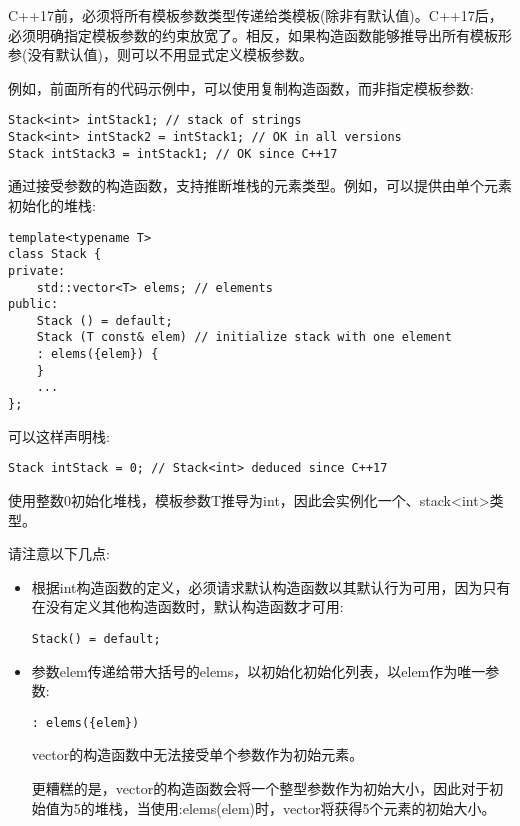 C++17前，必须将所有模板参数类型传递给类模板(除非有默认值)。C++17后，必须明确指定模板参数的约束放宽了。相反，如果构造函数能够推导出所有模板形参(没有默认值)，则可以不用显式定义模板参数。

例如，前面所有的代码示例中，可以使用复制构造函数，而非指定模板参数:

\begin{lstlisting}[style=styleCXX]
Stack<int> intStack1; // stack of strings
Stack<int> intStack2 = intStack1; // OK in all versions
Stack intStack3 = intStack1; // OK since C++17
\end{lstlisting}

通过接受参数的构造函数，支持推断堆栈的元素类型。例如，可以提供由单个元素初始化的堆栈:

\begin{lstlisting}[style=styleCXX]
template<typename T>
class Stack {
private:
	std::vector<T> elems; // elements
public:
	Stack () = default;
	Stack (T const& elem) // initialize stack with one element
	: elems({elem}) {
	}
	...
};
\end{lstlisting}

可以这样声明栈:

\begin{lstlisting}[style=styleCXX]
Stack intStack = 0; // Stack<int> deduced since C++17
\end{lstlisting}

使用整数0初始化堆栈，模板参数T推导为int，因此会实例化一个、stack<int>类型。

请注意以下几点:

\begin{itemize}
\item 
根据int构造函数的定义，必须请求默认构造函数以其默认行为可用，因为只有在没有定义其他构造函数时，默认构造函数才可用:
\begin{lstlisting}[style=styleCXX]
Stack() = default;
\end{lstlisting}

\item 
参数elem传递给带大括号的elems，以初始化初始化列表，以elem作为唯一参数:
\begin{lstlisting}[style=styleCXX]
: elems({elem})
\end{lstlisting}
vector的构造函数中无法接受单个参数作为初始元素。

\begin{tcolorbox}[colback=webgreen!5!white,colframe=webgreen!75!black]
\hspace*{0.75cm}更糟糕的是，vector的构造函数会将一个整型参数作为初始大小，因此对于初始值为5的堆栈，当使用:elems(elem)时，vector将获得5个元素的初始大小。
\end{tcolorbox}

\end{itemize}

